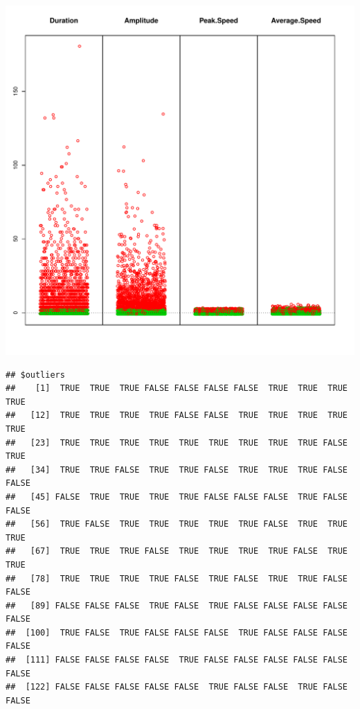 \documentclass{article}\usepackage[]{graphicx}\usepackage[]{color}
\makeatletter
\def\maxwidth{ %
  \ifdim\Gin@nat@width>\linewidth
    \linewidth
  \else
    \Gin@nat@width
  \fi
}
\newenvironment{kframe}{%
 \def\at@end@of@kframe{}%
 \ifinner\ifhmode%
  \def\at@end@of@kframe{\end{minipage}}%
  \begin{minipage}{\columnwidth}%
 \fi\fi%
 \def\FrameCommand##1{\hskip\@totalleftmargin \hskip-\fboxsep
 \colorbox{shadecolor}{##1}\hskip-\fboxsep
     \hskip-\linewidth \hskip-\@totalleftmargin \hskip\columnwidth}%
 \MakeFramed {\advance\hsize-\width
   \@totalleftmargin\z@ \linewidth\hsize
   \@setminipage}}%
 {\par\unskip\endMakeFramed%
 \at@end@of@kframe}
\newenvironment{knitrout}{}{} %
\makeatother
\begin{document}
\begin{knitrout}
\color{fgcolor}\begin{kframe}


{\ttfamily\noindent\itshape\color{messagecolor}{\#\# Loading required package: sgeostat}}\end{kframe}
\includegraphics[width=\maxwidth]{figure/unnamed-chunk-11} 
\begin{kframe}\begin{verbatim}
## $outliers
##    [1]  TRUE  TRUE  TRUE FALSE FALSE FALSE FALSE  TRUE  TRUE  TRUE  TRUE
##   [12]  TRUE  TRUE  TRUE  TRUE FALSE FALSE  TRUE  TRUE  TRUE  TRUE  TRUE
##   [23]  TRUE  TRUE  TRUE  TRUE  TRUE  TRUE  TRUE  TRUE  TRUE FALSE  TRUE
##   [34]  TRUE  TRUE FALSE  TRUE  TRUE FALSE  TRUE  TRUE  TRUE FALSE FALSE
##   [45] FALSE  TRUE  TRUE  TRUE  TRUE FALSE FALSE FALSE  TRUE FALSE FALSE
##   [56]  TRUE FALSE  TRUE  TRUE  TRUE  TRUE  TRUE FALSE  TRUE  TRUE  TRUE
##   [67]  TRUE  TRUE  TRUE FALSE  TRUE  TRUE  TRUE  TRUE FALSE  TRUE  TRUE
##   [78]  TRUE  TRUE  TRUE  TRUE FALSE  TRUE FALSE  TRUE  TRUE FALSE FALSE
##   [89] FALSE FALSE FALSE  TRUE FALSE  TRUE FALSE FALSE FALSE FALSE FALSE
##  [100]  TRUE FALSE  TRUE FALSE FALSE FALSE  TRUE FALSE FALSE FALSE FALSE
##  [111] FALSE FALSE FALSE FALSE  TRUE FALSE FALSE FALSE FALSE FALSE FALSE
##  [122] FALSE FALSE FALSE FALSE FALSE  TRUE FALSE FALSE  TRUE FALSE FALSE

\end{verbatim}
\end{kframe}
\end{knitrout}
\end{document}

